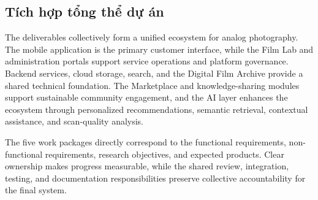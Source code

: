 \subsection*{Tích hợp tổng thể dự án}

The deliverables collectively form a unified ecosystem for analog photography.
The mobile application is the primary customer interface, while the Film Lab
and administration portals support service operations and platform governance.
Backend services, cloud storage, search, and the Digital Film Archive provide a
shared technical foundation. The Marketplace and knowledge-sharing modules
support sustainable community engagement, and the AI layer enhances the
ecosystem through personalized recommendations, semantic retrieval, contextual
assistance, and scan-quality analysis.

The five work packages directly correspond to the functional requirements,
non-functional requirements, research objectives, and expected products. Clear
ownership makes progress measurable, while the shared review, integration,
testing, and documentation responsibilities preserve collective accountability
for the final system.

